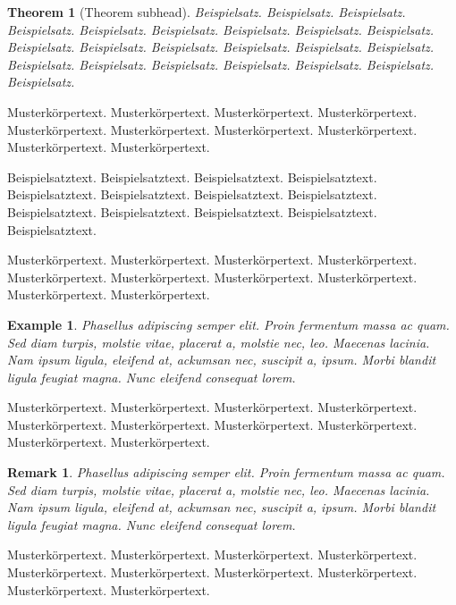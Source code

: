 \documentclass[pdflatex,sn-mathphys-num]{sn-jnl}%
\theoremstyle{thmstyleone}%
\newtheorem{theorem}{Theorem}%
{{proposition}[Theorem]Vorschlag}%
\theoremstyle{thmstyletwo}%
\newtheorem{example}{Example}%
\newtheorem{remark}{Remark}%
\theoremstyle{thmstylethree}%
\begin{document}
\begin{theorem}[Theorem subhead]\label{thm1} Beispielsatz. Beispielsatz. Beispielsatz. Beispielsatz. Beispielsatz. Beispielsatz. Beispielsatz. Beispielsatz. Beispielsatz. Beispielsatz. Beispielsatz. Beispielsatz. Beispielsatz. Beispielsatz. Beispielsatz. Beispielsatz. Beispielsatz. Beispielsatz. Beispielsatz. Beispielsatz. Beispielsatz. Beispielsatz. 
\end{theorem}

Musterkörpertext. Musterkörpertext. Musterkörpertext. Musterkörpertext. Musterkörpertext. Musterkörpertext. Musterkörpertext. Musterkörpertext. Musterkörpertext. Musterkörpertext.

\begin{proposition}
Beispielsatztext. Beispielsatztext. Beispielsatztext. Beispielsatztext. Beispielsatztext. Beispielsatztext. Beispielsatztext. Beispielsatztext. Beispielsatztext. Beispielsatztext. Beispielsatztext. Beispielsatztext. Beispielsatztext. 
\end{proposition}

Musterkörpertext. Musterkörpertext. Musterkörpertext. Musterkörpertext. Musterkörpertext. Musterkörpertext. Musterkörpertext. Musterkörpertext. Musterkörpertext. Musterkörpertext.

\begin{example}
Phasellus adipiscing semper elit. Proin fermentum massa ac quam. Sed diam turpis, molstie vitae, placerat a, molstie nec, leo. Maecenas lacinia. Nam ipsum ligula, eleifend at, ackumsan nec, suscipit a, ipsum. Morbi blandit ligula feugiat magna. Nunc eleifend consequat lorem. 
\end{example}

Musterkörpertext. Musterkörpertext. Musterkörpertext. Musterkörpertext. Musterkörpertext. Musterkörpertext. Musterkörpertext. Musterkörpertext. Musterkörpertext. Musterkörpertext.

\begin{remark}
Phasellus adipiscing semper elit. Proin fermentum massa ac quam. Sed diam turpis, molstie vitae, placerat a, molstie nec, leo. Maecenas lacinia. Nam ipsum ligula, eleifend at, ackumsan nec, suscipit a, ipsum. Morbi blandit ligula feugiat magna. Nunc eleifend consequat lorem. 
\end{remark}

Musterkörpertext. Musterkörpertext. Musterkörpertext. Musterkörpertext. Musterkörpertext. Musterkörpertext. Musterkörpertext. Musterkörpertext. Musterkörpertext. Musterkörpertext.
\end{document}
